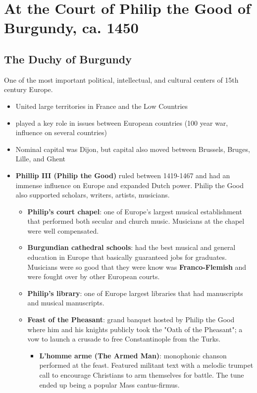 \documentclass{article}
\begin{document}
  \section{At the Court of Philip the Good of Burgundy, ca. 1450}
  \subsection{The Duchy of Burgundy}
  One of the most important political, intellectual, and cultural centers of 15th century Europe.
  \begin{itemize}
    \item United large territories in France and the Low Countries
    \item played a key role in issues between European countries (100 year war, influence on several countries)
    \item Nominal capital was Dijon, but capital also moved between Brussels, Bruges, Lille, and Ghent
    \item \textbf{Phillip III (Philip the Good)} ruled between 1419-1467 and had an immense influence on Europe and expanded Dutch power. Philip the Good also supported scholars, writers, artists, musicians.
      \begin{itemize}
        \item \textbf{Philip's court chapel}: one of Europe's largest musical establishment that performed both secular and church music. Musicians at the chapel were well compensated.
        \item \textbf{Burgundian cathedral schools}: had the best musical and general education in Europe that basically guaranteed jobs for graduates. Musicians were so good that they were know was \textbf{Franco-Flemish} and were fought over by other European courts.
        \item \textbf{Philip's library}: one of Europe largest libraries that had manuscripts and musical manuscripts.
        \item \textbf{Feast of the Pheasant}: grand banquet hosted by Philip the Good where him and his knights publicly took the "Oath of the Pheasant"; a vow to launch a crusade to free Constantinople from the Turks.
          \begin{itemize}
            \item \textbf{L'homme arme (The Armed Man)}: monophonic chanson performed at the feast. Featured militant text with a melodic trumpet call to encourage Christians to arm themselves for battle. The tune ended up being a popular Mass cantus-firmus.

\end{itemize}
\end{itemize}
\end{itemize}
\end{document}
